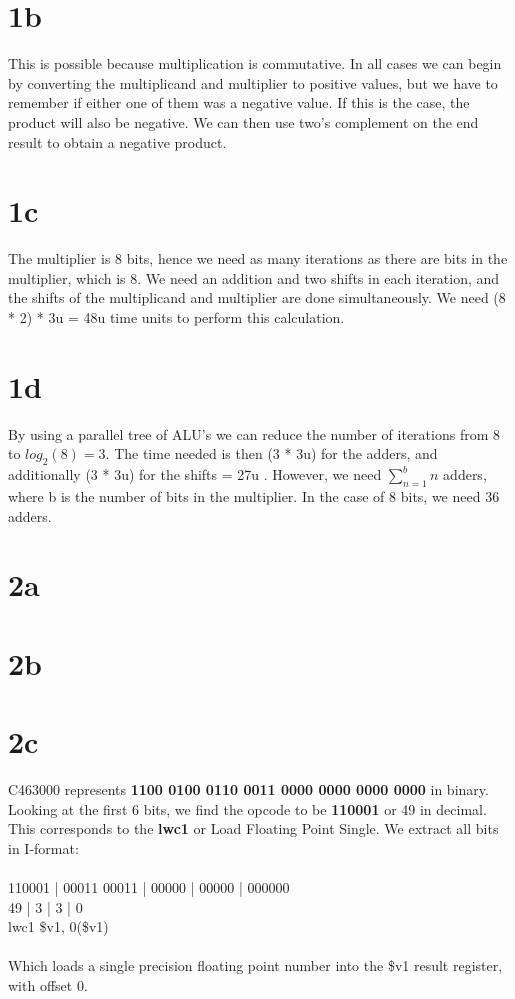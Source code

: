 \documentclass[10pt,a4paper]{article}
\begin{document}
	\section*{1b}
	This is possible because multiplication is commutative. In all cases we can begin by converting the multiplicand and multiplier to positive values, but we have to remember if either one of them was a negative value. If this is the case, the product will also be negative. We can then use two's complement on the end result to
	obtain a negative product.
	\section*{1c}
	The multiplier is 8 bits, hence we need as many iterations as there are bits in the multiplier, which is 8. We need an addition and two shifts in each iteration, and the shifts of the multiplicand and multiplier are done simultaneously. We need (8 * 2) * 3u  = 48u time units to perform this calculation.
	\section*{1d}
	By using a parallel tree of ALU's we can reduce the number of iterations from 8 to $log_{2}(8) = 3$. The time needed is then (3 *  3u) for the adders, and additionally (3 * 3u) for the shifts = 27u . However, we need $\sum_{n=1}^{b} n$ adders, where b is the number of bits in the multiplier. In the case of 8 bits, we need 36 adders.
	\section*{2a}
	\section*{2b}
	\section*{2c}
	C463000 represents \textbf{1100 0100 0110 0011 0000 0000 0000 0000} in binary. Looking at the first 6 bits, we find the opcode to be \textbf{110001} or 49 in decimal. This corresponds to the \textbf{lwc1} or Load Floating Point Single. We extract all bits in I-format: \\\\
	110001 | 00011  00011 | 00000 | 00000 | 000000 \\
	49 | 3 | 3 | 0 \\
	lwc1 \$v1, 0(\$v1) \\\\
	Which loads a single precision floating point number into the \$v1 result register, with offset 0.  
	
	
\end{document}
